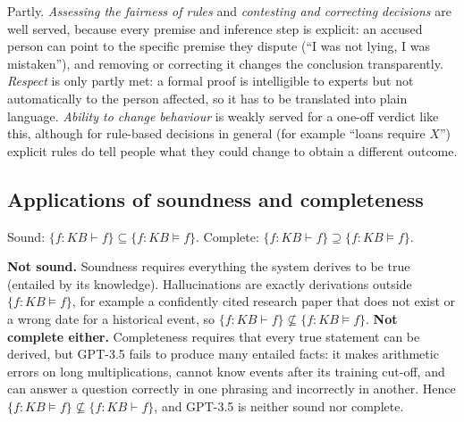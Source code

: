 \begin{solution}
Partly. \emph{Assessing the fairness of rules} and \emph{contesting and correcting decisions} are well served,
because every premise and inference step is explicit: an accused person can point to the specific premise they
dispute (``I was not lying, I was mistaken''), and removing or correcting it changes the conclusion transparently.
\emph{Respect} is only partly met: a formal proof is intelligible to experts but not automatically to the person
affected, so it has to be translated into plain language. \emph{Ability to change behaviour} is weakly served
for a one-off verdict like this, although for rule-based decisions in general (for example ``loans require
$X$'') explicit rules do tell people what they could change to obtain a different outcome.
\end{solution}

\subsection{Applications of soundness and completeness}

Sound: $\{f: KB\vdash f\}\subseteq\{f: KB\vDash f\}$. \quad Complete: $\{f: KB\vdash f\}\supseteq\{f: KB\vDash f\}$.

\begin{solution}
\textbf{Not sound.} Soundness requires everything the system derives to be true (entailed by its knowledge).
Hallucinations are exactly derivations outside $\{f:KB\vDash f\}$, for example a confidently cited research paper that
does not exist or a wrong date for a historical event, so $\{f:KB\vdash f\}\not\subseteq\{f:KB\vDash f\}$.
\textbf{Not complete either.} Completeness requires that every true statement can be derived, but GPT-3.5 fails to
produce many entailed facts: it makes arithmetic errors on long multiplications, cannot know events after its
training cut-off, and can answer a question correctly in one phrasing and incorrectly in another. Hence
$\{f:KB\vDash f\}\not\subseteq\{f:KB\vdash f\}$, and GPT-3.5 is neither sound nor complete.
\end{solution}

